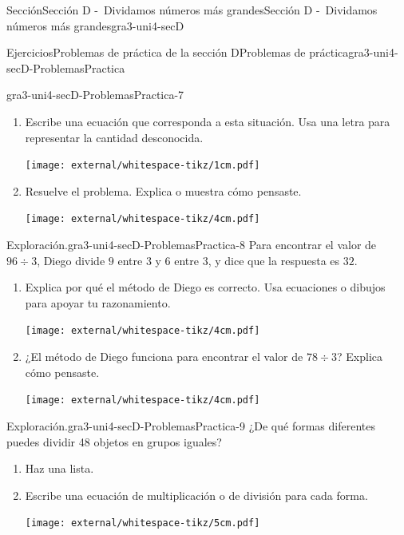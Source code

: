 \begin{sectionptx}{Sección}{Sección D -~Dividamos números más grandes}{}{Sección D -~Dividamos números más grandes}{}{}{gra3-uni4-secD}
\begin{exercises-subsection}{Ejercicios}{Problemas de práctica de la sección D}{}{Problemas de práctica}{}{}{gra3-uni4-secD-ProblemasPractica}
\begin{divisionexercise}{5}{}{}{gra3-uni4-secD-ProblemasPractica-7}
\begin{enumerate}[label={(\alph*)}]
\item{}Escribe una ecuación que corresponda a esta situación. Usa una letra para representar la cantidad desconocida.%
\begin{image}{0}{1}{0}{}%
\texttt{[image: external/whitespace-tikz/1cm.pdf]}
\end{image}%
\item{}Resuelve el problema. Explica o muestra cómo pensaste.%
\begin{image}{0}{1}{0}{}%
\texttt{[image: external/whitespace-tikz/4cm.pdf]}
\end{image}%
\end{enumerate}
\end{divisionexercise}%
\begin{divisionexercise}{6}{Exploración.}{}{gra3-uni4-secD-ProblemasPractica-8}%
Para encontrar el valor de \(96 \div 3\), Diego divide \(9\) entre \(3\) y \(6\) entre \(3\), y dice que la respuesta es \(32\).%
%
\begin{enumerate}[label={(\alph*)}]
\item{}Explica por qué el método de Diego es correcto. Usa ecuaciones o dibujos para apoyar tu razonamiento.%
\begin{image}{0}{1}{0}{}%
\texttt{[image: external/whitespace-tikz/4cm.pdf]}
\end{image}%
\item{}¿El método de Diego funciona para encontrar el valor de \(78 \div 3\)? Explica cómo pensaste.%
\begin{image}{0}{1}{0}{}%
\texttt{[image: external/whitespace-tikz/4cm.pdf]}
\end{image}%
\end{enumerate}
\end{divisionexercise}%
\begin{divisionexercise}{7}{Exploración.}{}{gra3-uni4-secD-ProblemasPractica-9}%
¿De qué formas diferentes puedes dividir 48 objetos en grupos iguales?%
%
\begin{enumerate}[label={(\alph*)}]
\item{}Haz una lista.%
\item{}Escribe una ecuación de multiplicación o de división para cada forma.%
\begin{image}{0}{1}{0}{}%
\texttt{[image: external/whitespace-tikz/5cm.pdf]}
\end{image}%
\end{enumerate}
\end{divisionexercise}%
\end{exercises-subsection}
\end{sectionptx}
